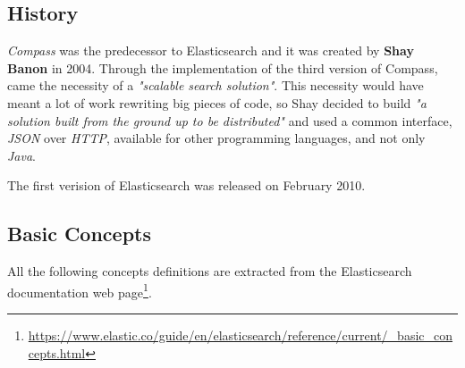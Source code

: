 \documentclass[a4paper, 12pt, english]{book}
\begin{document}
\subsection{History}
\label{subsec:elasticsearch-history}
\textit{Compass} was the predecessor to Elasticsearch and it was created by \textbf{Shay Banon} in 2004. Through the implementation of the third version of Compass, came the necessity of a \textit{"scalable search solution"}. This necessity would have meant a lot of work rewriting big pieces of code, so Shay decided to build \textit{"a solution built from the ground up to be distributed"} and used a common interface, \textit{JSON} over \textit{HTTP}, available for other programming languages, and not only \textit{Java}.

The first verision of Elasticsearch was released on February 2010.

\subsection{Basic Concepts}
\label{subsec:elasticsearch-basic-concepts}

All the following concepts definitions are extracted from the Elasticsearch documentation web page\footnote{\url{https://www.elastic.co/guide/en/elasticsearch/reference/current/_basic_concepts.html}}.
\end{document}
